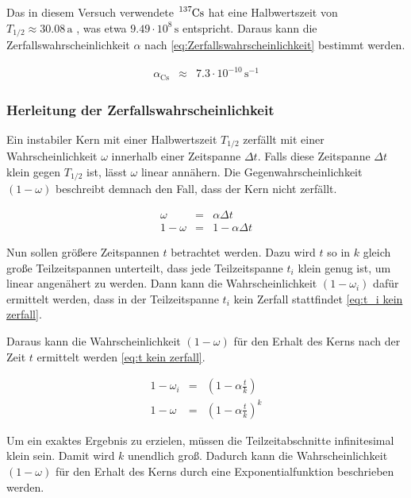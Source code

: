 \documentclass[12pt,a4paper]{scrartcl}
\numberwithin{equation}{section} %
\begin{document}
\noindent
Das in diesem Versuch verwendete $\ce{^{137}Cs}$ hat eine Halbwertszeit von $T_{1/2}\approx30.08\mathrm{\,a}$ \cite{Chart of Nuclides}, was etwa $9.49 \cdot 10^8 \mathrm{\,s}$ entspricht. Daraus kann die Zerfallswahrscheinlichkeit $\alpha$ nach \eqref{eq:Zerfallswahrscheinlichkeit} bestimmt werden.

\begin{eqnarray}
	\alpha_\mathrm{Cs} &\approx& 7.3 \cdot 10^{-10} \mathrm{\,s^{-1}}
\end{eqnarray}

\hypertarget{Herleitung Zerfallswahrscheinlichkeit}{\subsubsection{Herleitung der Zerfallswahrscheinlichkeit}\label{Herleitung Zerfallswahrscheinlichkeit}}
Ein instabiler Kern mit einer Halbwertszeit $T_{1/2}$ zerfällt mit einer Wahrscheinlichkeit $\omega$ innerhalb einer Zeitspanne $\Delta t$. Falls diese Zeitspanne $\Delta t$ klein gegen $T_{1/2}$ ist, lässt $\omega$ linear annähern. Die Gegenwahrscheinlichkeit $(1-\omega)$ beschreibt demnach den Fall, dass der Kern nicht zerfällt.

\begin{eqnarray}
	\omega &=& \alpha \Delta t \label{eq:Zerfallswkt linear} \\
	1 - \omega &=& 1 - \alpha \Delta t
\end{eqnarray}

\noindent
Nun sollen größere Zeitspannen $t$ betrachtet werden. Dazu wird $t$ so in $k$ gleich große Teilzeitspannen unterteilt, dass jede Teilzeitspanne $t_i$ klein genug ist, um linear angenähert zu werden. Dann kann die Wahrscheinlichkeit $(1 - \omega_i)$ dafür ermittelt werden, dass in der Teilzeitspanne $t_i$ kein Zerfall stattfindet \eqref{eq:t_i kein zerfall}.

Daraus kann die Wahrscheinlichkeit $(1 - \omega)$ für den Erhalt des Kerns nach der Zeit $t$ ermittelt werden \eqref{eq:t kein zerfall}.

\begin{eqnarray}
	1 - \omega_i &=& \left(1 - \alpha \frac{t}{k}\right) \label{eq:t_i kein zerfall} \\
	1 - \omega &=& \left(1 - \alpha \frac{t}{k} \right)^k \label{eq:t kein zerfall}
\end{eqnarray}

\noindent
Um ein exaktes Ergebnis zu erzielen, müssen die Teilzeitabschnitte infinitesimal klein sein. Damit wird $k$ unendlich groß. Dadurch kann die Wahrscheinlichkeit $(1-\omega)$ für den Erhalt des Kerns durch eine Exponentialfunktion beschrieben werden.
\end{document}
